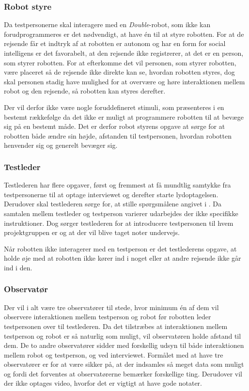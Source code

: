 \subsubsection*{Robot styre}
Da testpersonerne skal interagere med en \textit{Double}-robot, som ikke kan forudprogrammeres er det nødvendigt, at have én til at styre robotten. For at de rejsende får et indtryk af at robotten er autonom og har en form for social intelligens er det favorabelt, at den rejsende ikke registrerer, at det er en person, som styrer robotten. For at efterkomme det vil personen, som styrer robotten, være placeret så de rejsende ikke direkte kan se, hvordan robotten styres, dog skal personen stadig have mulighed for at overvære og høre interaktionen mellem robot og den rejsende, så robotten kan styres derefter.

Der vil derfor ikke være nogle foruddefineret stimuli, som præsenteres i en bestemt rækkefølge da det ikke er muligt at programmere robotten til at bevæge sig på en bestemt måde. Det er derfor robot styrens opgave at sørge for at robotten både ændre sin højde, afstanden til testpersonen, hvordan robotten henvender sig og generelt bevæger sig.   

\subsubsection*{Testleder}
Testlederen har flere opgaver, først og fremmest at få mundtlig samtykke fra testpersonerne til at optage interviewet og derefter starte lydoptagelsen. Derudover skal testlederen sørge for, at stille spørgsmålene angivet i . Da samtalen mellem testleder og testperson varierer udarbejdes der ikke specifikke instruktioner. Dog sørger testlederen for at introducere testpersonen til hvem projektgruppen er og at der vil blive taget noter undervejs. 

Når robotten ikke interagerer med en testperson er det testlederens opgave, at holde øje med at robotten ikke kører ind i noget eller at andre rejsende ikke går ind i den.    

\subsubsection*{Observatør}
Der vil i alt være tre observatører til stede, hvor minimum én af dem vil observere interaktionen mellem testperson og robot før robotten leder testpersonen over til testlederen. Da det tilstræbes at interaktionen mellem testperson og robot er så naturlig som muligt, vil observatøren holde afstand til dem. De to andre observatører sidder med forskellig udsyn til både interaktionen mellem robot og testperson, og ved interviewet. Formålet med at have tre observatører er for at være sikker på, at der indsamles så meget data som muligt og fordi det forventes at observatørerne bemærker forskellige ting. Derudover vil der ikke optages video, hvorfor det er vigtigt at have gode notater. 

